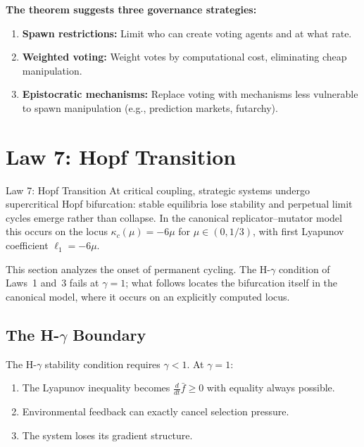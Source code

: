 \documentclass[12pt]{article}
\newcommand{\added}[1]{\textbf{#1}}
\begin{document}
\added{\textbf{The theorem suggests three governance strategies:}}
\begin{enumerate}
    \item \textbf{Spawn restrictions:} Limit who can create voting agents and at what rate.
    \item \textbf{Weighted voting:} Weight votes by computational cost, eliminating cheap manipulation.
    \item \textbf{Epistocratic mechanisms:} Replace voting with mechanisms less vulnerable to spawn manipulation (e.g., prediction markets, futarchy).
\end{enumerate}




\section{Law 7: Hopf Transition}
\label{sec:law7}

\begin{lawbox}{Law 7: Hopf Transition}
At critical coupling, strategic systems undergo supercritical Hopf bifurcation:
stable equilibria lose stability and perpetual limit cycles emerge rather than
collapse. In the canonical replicator--mutator model this occurs on the locus
$\kappa_c(\mu) = -6\mu$ for $\mu \in (0,1/3)$, with first Lyapunov coefficient
$\ell_1 = -6\mu$.
\end{lawbox}

This section analyzes the onset of permanent cycling. The H-$\gamma$ condition of Laws~1 and~3 fails at $\gamma = 1$; what follows locates the bifurcation itself in the canonical model, where it occurs on an explicitly computed locus.

\subsection{The H-$\gamma$ Boundary}

The H-$\gamma$ stability condition requires $\gamma < 1$. At $\gamma = 1$:
\begin{enumerate}
    \item The Lyapunov inequality becomes $\frac{d}{dt}\bar{f} \geq 0$ with equality always possible.
    \item Environmental feedback can exactly cancel selection pressure.
    \item The system loses its gradient structure.
\end{enumerate}
\end{document}
